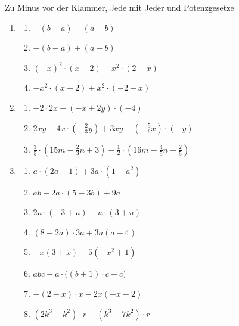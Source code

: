 \begin{ueb}
    {Zu Minus vor der Klammer, Jede mit Jeder und Potenzgesetze}{}
    \begin{enumerate}

        \item
              \begin{enumerate}
                  \item \(-(b-a)-(a-b)\)
                  \item \(-(b-a)+(a-b)\)
                  \item \((-x)^2\cdot(x-2)-x^2\cdot(2-x)\)
                  \item \(-x^2\cdot(x-2)+x^2\cdot(-2-x)\)
              \end{enumerate}

        \item
              \begin{enumerate}
                  \item \(-2\cdot2x+(-x+2y)\cdot(-4)\)
                  \item \(2xy-4x\cdot\left(-\frac{2}{3}y\right)+3xy-\left(-\frac{5}{6}x\right)\cdot(-y)\)
                  \item \(\frac{3}{5}\cdot\left(15m-\frac{2}{3}n+3\right)-\frac{1}{2}\cdot\left(16m-\frac{4}{5}n-\frac{2}{5}\right)\)
              \end{enumerate}

        \item
              \begin{enumerate}
                  \item \(a\cdot(2a-1)+3a\cdot(1-a^2)\)
                  \item \(ab-2a\cdot(5-3b)+9a\)
                  \item \(2u\cdot(-3+u)-u\cdot(3+u)\)
                  \item \((8-2a)\cdot3a+3a(a-4)\)
                  \item \(-x(3+x)-5(-x^2+1)\)
                  \item \(abc-a\cdot\bigl((b+1)\cdot c-c\bigr)\)
                  \item \(-(2-x)\cdot x-2x(-x+2)\)
                  \item \((2k^3-k^2)\cdot r-(k^3-7k^2)\cdot r\)
              \end{enumerate}


\end{enumerate}
\end{ueb}
